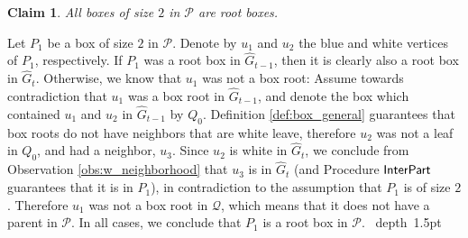 \documentclass[11pt]{article}
\def\Proof{\par\noindent{\bf Proof:~}}
\def\blackslug{\hbox{\hskip 1pt \vrule width 4pt height 8pt
    depth 1.5pt \hskip 1pt}}
\def\QED{\quad\blackslug\lower 8.5pt\null\par}
\newtheorem{claim}[theorem]{Claim}
\theoremstyle{definition}
\def\interpart{\mbox{\sf InterPart}}
\begin{document}
\begin{claim}
\label{claim:ana_box:p1_root}
All boxes of size $2$ in $\mathcal{P}$ are root boxes.
\end{claim}
\Proof
Let $P_1$ be a box of size $2$ in $\mathcal{P}$.
Denote by $u_1$ and $u_2$ the blue and white vertices of $P_1$, respectively.
If $P_1$ was a root box in $\hat{G}_{t-1}$, then it is clearly also a root box in $\hat{G}_t$.
Otherwise, we know that $u_1$ was not a box root:
Assume towards contradiction that $u_1$ was a box root in $\hat{G}_{t-1}$, and denote the box which contained $u_1$ and $u_2$ in $\hat{G}_{t-1}$ by $Q_0$.
Definition \ref{def:box_general} guarantees that box roots do not have neighbors that are white leave, therefore $u_2$ was not a leaf in $Q_0$, and had a neighbor, $u_3$.
Since $u_2$ is white in $\hat{G}_t$, we conclude from Observation \ref{obs:w_neighborhood} that $u_3$ is in $\hat{G}_t$ (and Procedure $\interpart$ guarantees that it is in $P_1$), in contradiction to the assumption that $P_1$ is of size $2$.
Therefore $u_1$ was not a box root in $\mathcal{Q}$, which means that it does not have a parent in $\mathcal{P}$.
In all cases, we conclude that $P_1$ is a root box in $\mathcal{P}$.
\QED
\end{document}

